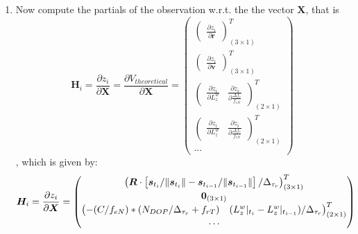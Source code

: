 \begin{enumerate}
    \item Now compute the partials of the observation w.r.t. the the vector $\bm{X}$, that is 
        \begin{equation}
          \bm{H}_i = \frac{\partial z_i}{\partial \bm{X}} = \frac{\partial V_{theoretical}}{\partial \bm{X}} = 
          \begin{pmatrix} 
            \begin{pmatrix}\frac{\partial z_i}{\partial \bm{r}}\end{pmatrix}^T_{(3 \times 1)} \\
            \begin{pmatrix}\frac{\partial z_i}{\partial \bm{v}}\end{pmatrix}^T_{(3 \times 1)} \\
            \begin{pmatrix}\frac{\partial z_i}{\partial L^w_z} & \frac{\partial z_i}{\partial \frac{\Delta f_e}{f_{eN}}}\end{pmatrix}^T_{(2 \times 1)} \\
            \begin{pmatrix}\frac{\partial z_i}{\partial L^w_z} & \frac{\partial z_i}{\partial \frac{\Delta f_e}{f_{eN}}}\end{pmatrix}^T_{(2 \times 1)} \\
            \cdots
          \end{pmatrix} 
          \end{equation}
        , which is given by:
        \begin{equation}
            \bm{H}_i = \frac{\partial z_i}{\partial \bm{X}} = 
            \begin{pmatrix} 
                \begin{pmatrix}
                     \bm{R} \cdot \left[ \bm{s}_{t_i} / \lVert\bm{s}_{t_i}\rVert - 
                     \bm{s}_{t_{i-1}} / \lVert\bm{s}_{t_{i-1}}\rVert \right] / \Delta _{\tau_r} \end{pmatrix}^T_{(3 \times 1)} \\
                 \bm{0}_{(3 \times 1)} \\
                 \begin{pmatrix} -(C / f_{eN}) * (N_{DOP} / \Delta _{\tau_r}  + f_{rT}) & (L^w_z|_{t_i} - L^w_z|_{t_{i-1}}) / \Delta _{\tau_r} \end{pmatrix}^T_{(2 \times 1)} \\
                 \cdots
            \end{pmatrix}
        \end{equation}

\end{enumerate}
